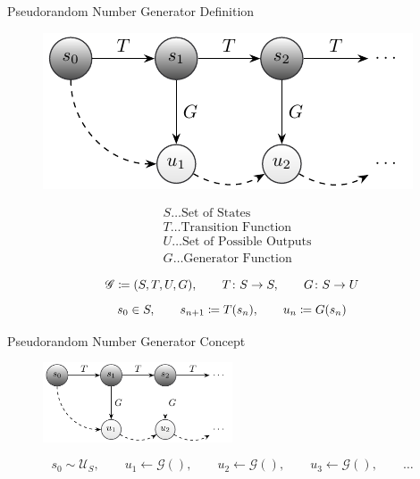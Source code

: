 \documentclass[aspectratio=169]{beamer}
\begin{document}
    \begin{frame}{Pseudorandom Number Generator Definition}
      \begin{minipage}[c]{0.49\textwidth}
        \begin{figure}
          \includegraphics[width=\textwidth]{figures/sequence_generation_scheme.pdf}
        \end{figure}
      \end{minipage}
      \begin{minipage}[c]{0.49\textwidth}
        \begin{align*}
          &S\ldots\text{Set of States}\\
          &T\ldots\text{Transition Function} \\
          &U\ldots\text{Set of Possible Outputs} \\
          &G\ldots\text{Generator Function}
        \end{align*}
      \end{minipage}
      \vfill
      \begin{mybox}
        \[
          \mathscr{G} \coloneqq (S,T,U,G),\qquad T\colon S\to S, \qquad G\colon S\to U
        \]
        \[
          s_0\in S, \qquad s_{n+1} \coloneqq T(s_n), \qquad u_n \coloneqq G(s_n)
        \]
      \end{mybox}
    \end{frame}

    \begin{frame}{Pseudorandom Number Generator Concept}
      \begin{figure}
        \includegraphics[width=0.5\textwidth]{figures/sequence_generation_scheme.pdf}
      \end{figure}
      \vfill
      \begin{mybox}
        \[
          s_0 \sim \mathscr{U}_S,\qquad
          u_1 \leftarrow \mathscr{G}(),\qquad
          u_2 \leftarrow \mathscr{G}(),\qquad
          u_3 \leftarrow \mathscr{G}(),\qquad \ldots
        \]
      \end{mybox}
    \end{frame}
\end{document}
